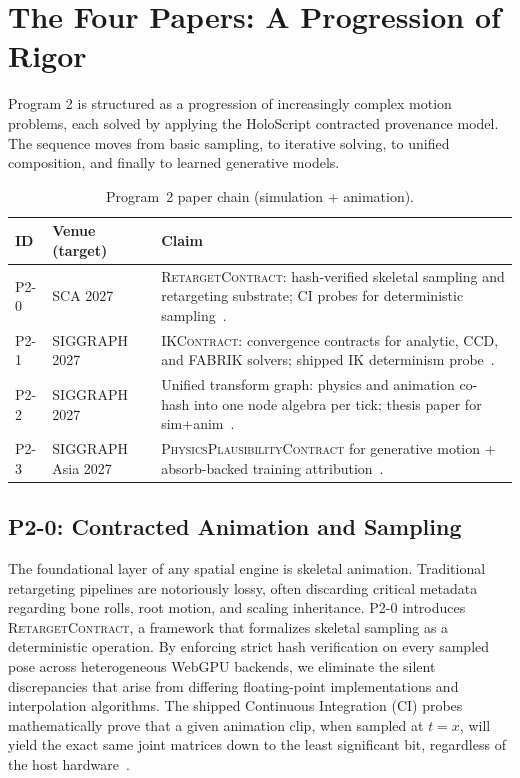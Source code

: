 \documentclass[sigconf,nonacm]{acmart}
\newcommand{\retargetcontract}{\textsc{RetargetContract}}
\newcommand{\ikcontract}{\textsc{IKContract}}
\newcommand{\plausibility}{\textsc{PhysicsPlausibilityContract}}
\begin{document}
\section{The Four Papers: A Progression of Rigor}

Program 2 is structured as a progression of increasingly complex motion problems, each solved by applying the HoloScript contracted provenance model. The sequence moves from basic sampling, to iterative solving, to unified composition, and finally to learned generative models.

\begin{table}[t]
  \centering
  \caption{Program~2 paper chain (simulation + animation).}
  \label{tab:program2}
  \small
  \begin{tabular}{@{}llp{5.8cm}@{}}
    \toprule
    \textbf{ID} & \textbf{Venue (target)} & \textbf{Claim} \\
    \midrule
    P2-0 & SCA 2027 & \retargetcontract{}: hash-verified skeletal sampling and retargeting substrate; CI probes for deterministic sampling~\cite{paper-6-anim-sca2027}. \\
    P2-1 & SIGGRAPH 2027 & \ikcontract{}: convergence contracts for analytic, CCD, and FABRIK solvers; shipped IK determinism probe~\cite{paper-7-ik-siggraph2027}. \\
    P2-2 & SIGGRAPH 2027 & Unified transform graph: physics and animation co-hash into one node algebra per tick; thesis paper for sim+anim~\cite{paper-8-unified-siggraph2027}. \\
    P2-3 & SIGGRAPH Asia 2027 & \plausibility{} for generative motion + absorb-backed training attribution~\cite{paper-9-motion-asia2027}. \\
    \bottomrule
  \end{tabular}
\end{table}

\subsection{P2-0: Contracted Animation and Sampling}
The foundational layer of any spatial engine is skeletal animation. Traditional retargeting pipelines are notoriously lossy, often discarding critical metadata regarding bone rolls, root motion, and scaling inheritance. P2-0 introduces \retargetcontract{}, a framework that formalizes skeletal sampling as a deterministic operation. By enforcing strict hash verification on every sampled pose across heterogeneous WebGPU backends, we eliminate the silent discrepancies that arise from differing floating-point implementations and interpolation algorithms. The shipped Continuous Integration (CI) probes mathematically prove that a given animation clip, when sampled at $t = x$, will yield the exact same joint matrices down to the least significant bit, regardless of the host hardware~\cite{paper-6-anim-sca2027}.
\end{document}
